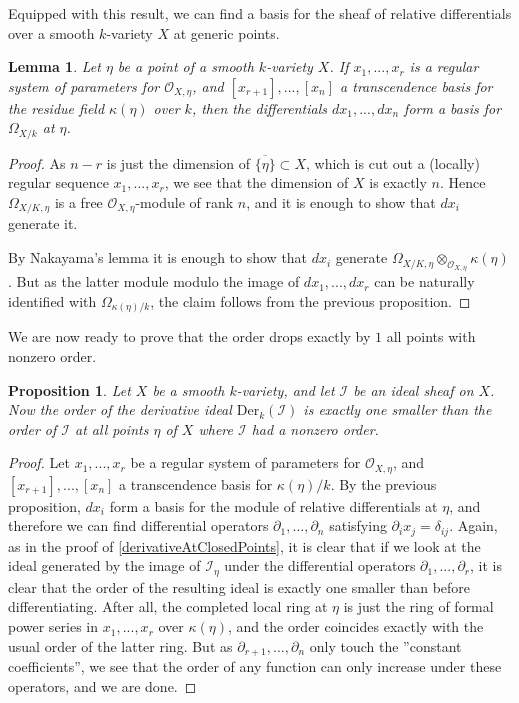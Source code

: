 \documentclass[12pt,a4paper,leqno]{article}
\newcommand{\OO}{\mathcal{O}}
\newcommand{\der}{\mathrm{Der}}
\newcommand{\fref}[1]{\hyperref[{#1}]{\ref*{#1}}}
\theoremstyle{plain}
\newtheorem{lem}[theo]{Lemma}
\newtheorem{prop}[theo]{Proposition}
\theoremstyle{definition}
\theoremstyle{remark}
\begin{document}
Equipped with this result, we can find a basis for the sheaf of relative differentials over a smooth $k$-variety $X$ at generic points.

\begin{lem}
Let $\eta$ be a point of a smooth $k$-variety $X$. If $x_1,...,x_r$ is a regular system of parameters for $\OO_{X,\eta}$, and $[x_{r+1}],...,[x_n]$ a transcendence basis for the residue field $\kappa(\eta)$ over $k$, then the differentials $dx_1,...,dx_n$ form a basis for $\Omega_{X/k}$ at $\eta$.
\end{lem}
\begin{proof}
As $n-r$ is just the dimension of $\overline{\{\eta\}} \subset X$, which is cut out a (locally) regular sequence $x_1,...,x_r$, we see that the dimension of $X$ is exactly $n$. Hence $\Omega_{X/K,\eta}$ is a free $\OO_{X,\eta}$-module of rank $n$, and it is enough to show that $dx_i$ generate it.

By Nakayama's lemma it is enough to show that $dx_i$ generate $\Omega_{X/K,\eta} \otimes_{\OO_{X,\eta}} \kappa (\eta)$. But as the latter module modulo the image of $dx_1,...,dx_r$ can be naturally identified with $\Omega_{\kappa(\eta) /k}$, the claim follows from the previous proposition. 
\end{proof}

We are now ready to prove that the order drops exactly by $1$ all points with nonzero order.

\begin{prop}
Let $X$ be a smooth $k$-variety, and let $\mathscr{I}$ be an ideal sheaf on $X$. Now the order of the derivative ideal $\der_k (\mathscr{I})$ is exactly one smaller than the order of $\mathscr{I}$ at all points $\eta$ of $X$ where $\mathscr{I}$ had a nonzero order.
\end{prop}
\begin{proof}
Let $x_1,...,x_r$ be a regular system of parameters for $\OO_{X,\eta}$, and $[x_{r+1}],...,[x_n]$ a transcendence basis for $\kappa(\eta)/k$. By the previous proposition, $dx_i$ form a basis for the module of relative differentials at $\eta$, and therefore we can find differential operators $\partial_1,...,\partial_n$ satisfying $\partial_i x_j = \delta_{ij}$. Again, as in the proof of \fref{derivativeAtClosedPoints}, it is clear that if we look at the ideal generated by the image of $\mathscr{I}_\eta$ under the differential operators $\partial_1,...,\partial_r$, it is clear that the order of the resulting ideal is exactly one smaller than before differentiating. After all, the completed local ring at $\eta$ is just the ring of formal power series in $x_1,...,x_r$ over $\kappa(\eta)$, and the order coincides exactly with the usual order of the latter ring. But as $\partial_{r+1},...,\partial_n$ only touch the ''constant coefficients'', we see that the order of any function can only increase under these operators, and we are done. 
\end{proof}
\end{document}
